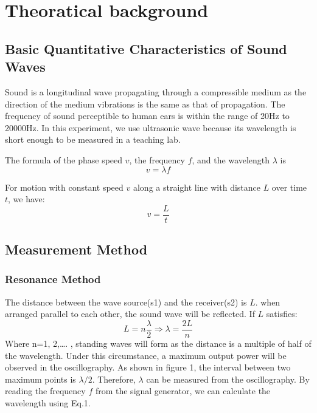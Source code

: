 \documentclass[12pt,a4paper]{article}
\begin{document}
\section{Theoratical background}
\subsection{Basic Quantitative Characteristics of Sound Waves}

Sound is a longitudinal wave propagating through a compressible medium as the direction of the medium vibrations is the same as that of propagation. The frequency of sound perceptible to human ears is within the range of 20Hz to 20000Hz. In this experiment, we use ultrasonic wave because its wavelength is short enough to be measured in a teaching lab.\par 
The formula of the phase speed $v$, the frequency $f$, and the wavelength $\lambda$ is
\begin{equation}
    v=\lambda f
\end{equation}\par 
For motion with constant speed $v$ along a straight line with distance $L$ over time $t$, we have:
\begin{equation}
    v=\frac{L}{t}
\end{equation}

\subsection{Measurement Method}
\subsubsection{Resonance Method}

The distance between the wave source(s1) and the receiver(s2) is $L$. when arranged parallel to each other, the sound wave will be reflected. If $L$ satisfies:
\begin{equation}
    L=n \frac{\lambda}{2} 
    \Longrightarrow 
    \lambda=\frac{2L}{n}
\end{equation}                     
Where n=1, 2,…. , standing waves will form as the distance is a multiple of half of the wavelength. Under this circumstance, a maximum output power will be observed in the oscillography. As shown in figure 1, the interval between two maximum points is $\lambda/2$. Therefore, $\lambda$ can be measured from the oscillography. By reading the frequency $f$ from the signal generator, we can calculate the wavelength using Eq.1. 
\end{document}
